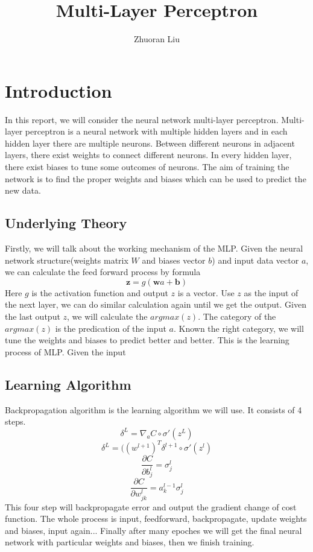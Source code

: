 \documentclass[12pt,a4paper]{article}
\author{Zhuoran Liu}
\title{Multi-Layer Perceptron}
\begin{document}
\maketitle

\color{black}
\newpage
\section{Introduction}
In this report, we will consider the neural network multi-layer perceptron. Multi-layer perceptron is a neural network with multiple hidden layers and in each hidden layer there are multiple neurons. Between different neurons in adjacent layers, there exist weights to connect different neurons. In every hidden layer, there exist biases to tune some outcomes of neurons. The aim of training the network is to find the proper weights and biases which can be used to predict the new data.
\subsection{Underlying Theory}
Firstly, we will talk about the working mechanism of the MLP. Given the neural network structure(weights matrix $W$ and biases vector $b$) and input data vector $a$, we can calculate the feed forward process by formula
\[\textbf{z} = g(\textbf{w}a + \textbf{b})\]
Here $g$ is the activation function and output $z$ is a vector. Use $z$ as the input of the next layer, we can do similar calculation again until we get the output. Given the last output $z$, we will calculate the $argmax(z)$. The category of the $argmax(z)$ is the predication of the input $a$. Known the right category, we will tune the weights and biases to predict better and better. This is the learning process of MLP. 
Given the input 
\subsection{Learning Algorithm}
Backpropagation algorithm is the learning algorithm we will use. It consists of 4 steps.
\[\delta^L = \nabla_{a} C \circ \sigma'(z^{L})\]
\[\delta^L = ((w^{l+1})^{T} \delta^{l+1} \circ \sigma'(z^{l})\]
\[\frac{\partial C}{\partial b_{j}^{l}} = \sigma_{j}^{l}\]
\[\frac{\partial C}{\partial w_{jk}^{l}} = a_{k}^{l-1} \sigma_{j}^{l}\]
This four step will backpropagate error and output the gradient change of cost function. The whole process is input, feedforward, backpropagate, update weights and biases, input again... Finally after many epoches we will get the final neural network with particular weights and biases, then we finish training.
\newpage
\end{document}
